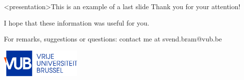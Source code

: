\begin{frame}<presentation>{This is an example of a last slide} %
	Thank you for your attention!
	
	I hope that these information was useful for you.
	
	For remarks, suggestions or questions: contact me at svend.bram@vub.be
	
	\center\includegraphics[width=0.3\textwidth]{figs/vubNewLogo.eps}
\end{frame}
